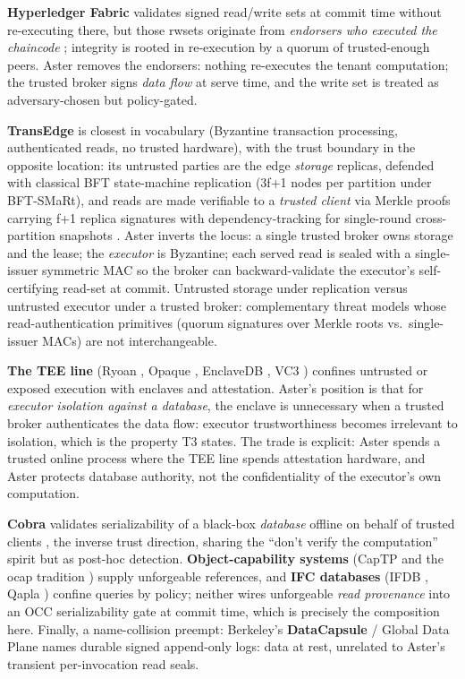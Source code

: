 \documentclass[
  11pt,
]{article}
\begin{document}
\textbf{Hyperledger Fabric} validates signed read/write sets at commit time without re-executing there, but those rwsets originate from \emph{endorsers who executed the chaincode} \cite{fabricdocs}; integrity is rooted in re-execution by a quorum of trusted-enough peers. Aster removes the endorsers: nothing re-executes the tenant computation; the trusted broker signs \emph{data flow} at serve time, and the write set is treated as adversary-chosen but policy-gated.

\textbf{TransEdge} is closest in vocabulary (Byzantine transaction processing, authenticated reads, no trusted hardware), with the trust boundary in the opposite location: its untrusted parties are the edge \emph{storage} replicas, defended with classical BFT state-machine replication (3f+1 nodes per partition under BFT-SMaRt), and reads are made verifiable to a \emph{trusted client} via Merkle proofs carrying f+1 replica signatures with dependency-tracking for single-round cross-partition snapshots \cite{transedge2023}. Aster inverts the locus: a single trusted broker owns storage and the lease; the \emph{executor} is Byzantine; each served read is sealed with a single-issuer symmetric MAC so the broker can backward-validate the executor's self-certifying read-set at commit. Untrusted storage under replication versus untrusted executor under a trusted broker: complementary threat models whose read-authentication primitives (quorum signatures over Merkle roots vs.~single-issuer MACs) are not interchangeable.

\textbf{The TEE line} (Ryoan \cite{ryoan2016}, Opaque \cite{opaque2017}, EnclaveDB \cite{enclavedb2018}, VC3 \cite{vc3-2015}) confines untrusted or exposed execution with enclaves and attestation. Aster's position is that for \emph{executor isolation against a database}, the enclave is unnecessary when a trusted broker authenticates the data flow: executor trustworthiness becomes irrelevant to isolation, which is the property T3 states. The trade is explicit: Aster spends a trusted online process where the TEE line spends attestation hardware, and Aster protects database authority, not the confidentiality of the executor's own computation.

\textbf{Cobra} validates serializability of a black-box \emph{database} offline on behalf of trusted clients \cite{cobra2020}, the inverse trust direction, sharing the ``don't verify the computation'' spirit but as post-hoc detection. \textbf{Object-capability systems} (CapTP and the ocap tradition \cite{captp2006}) supply unforgeable references, and \textbf{IFC databases} (IFDB \cite{ifdb2013}, Qapla \cite{qapla2017}) confine queries by policy; neither wires unforgeable \emph{read provenance} into an OCC serializability gate at commit time, which is precisely the composition here. Finally, a name-collision preempt: Berkeley's \textbf{DataCapsule} / Global Data Plane \cite{gdp2019} names durable signed append-only logs: data at rest, unrelated to Aster's transient per-invocation read seals.
\end{document}
